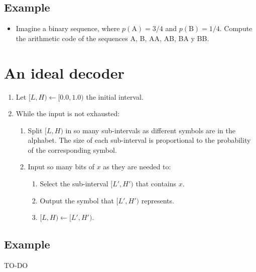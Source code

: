 \subsection{Example}
\begin{itemize}
\tightlist
\item
  Imagine a binary sequence, where \(p(\text{A})=3/4\) and
  \(p(\text{B})=1/4\). Compute the arithmetic code of the sequences A,
  B, AA, AB, BA y BB.
\end{itemize}

\section{An ideal decoder}
\begin{enumerate}
\def\labelenumi{\arabic{enumi}.}
\tightlist
\item
  Let \([L,H)\leftarrow [0.0,1.0)\) the initial interval.
\item
  While the input is not exhausted:
  \begin{enumerate}
  \def\labelenumii{\arabic{enumii}.}
  \tightlist
  \item
    Split \([L,H)\) in so many sub-intervals as different symbols are in
    the alphabet. The size of each sub-interval is proportional to the
    probability of the corresponding symbol.
  \item
    Input so many bits of \(x\) as they are needed to:

    \begin{enumerate}
    \def\labelenumiii{\arabic{enumiii}.}
    \tightlist
    \item
      Select the sub-interval \([L',H')\) that contains \(x\).
    \item
      Output the symbol that \([L',H')\) represents.
    \item
      \([L,H)\leftarrow[L',H')\).
    \end{enumerate}
  \end{enumerate}
\end{enumerate}

\subsection{Example}

TO-DO

